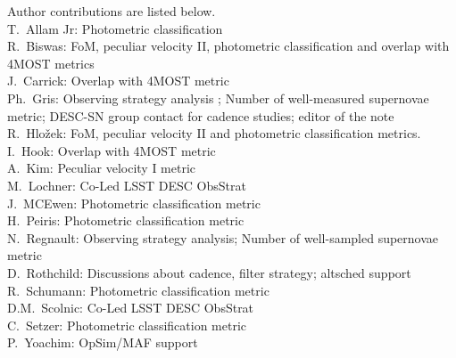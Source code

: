 Author contributions are listed below. \\
T.~Allam Jr: Photometric classification \\
R.~Biswas: FoM, peculiar velocity II, photometric classification and overlap with 4MOST metrics \\
J.~Carrick: Overlap with 4MOST metric \\
Ph.~Gris: Observing strategy analysis ; Number of well-measured supernovae metric; DESC-SN group contact for cadence studies; editor of the note \\
R.~Hlo\v{z}ek: FoM, peculiar velocity II and photometric classification metrics. \\
I.~Hook: Overlap with 4MOST metric \\
A.~Kim: Peculiar velocity I metric \\
M.~Lochner: Co-Led LSST DESC ObsStrat \\
J.~MCEwen: Photometric classification metric \\
H.~Peiris: Photometric classification metric \\
N.~Regnault: Observing strategy analysis; Number of well-sampled supernovae metric \\
D.~Rothchild: Discussions about cadence, filter strategy; altsched support \\
R.~Schumann: Photometric classification metric \\
D.M.~Scolnic: Co-Led LSST DESC ObsStrat \\
C.~Setzer: Photometric classification metric \\
P.~Yoachim: OpSim/MAF support \\
